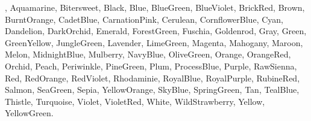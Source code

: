 \documentclass[a4paper,11pt]{article}
\begin{document}
, {\color{Aquamarine} Aquamarine},
{\color{Bittersweet} Bitersweet}, {\color{Black} Black}, {\color{Blue}
  Blue}, {\color{BlueGreen} BlueGreen}, {\color{BlueViolet}
  BlueViolet}, {\color{BrickRed} BrickRed}, {\color{Brown} Brown},
{\color{BurntOrange} BurntOrange}, {\color{CadetBlue} CadetBlue},
{\color{CarnationPink} CarnationPink}, {\color{Cerulean} Cerulean},
{\color{CornflowerBlue} CornflowerBlue}, {\color{Cyan} Cyan},
{\color{Dandelion} Dandelion}, {\color{DarkOrchid} DarkOrchid},
{\color{Emerald} Emerald}, {\color{ForestGreen} ForestGreen},
{\color{Fuchsia} Fuschia}, {\color{Goldenrod} Goldenrod},
{\color{Gray} Gray}, {\color{Green} Green}, {\color{GreenYellow}
  GreenYellow}, {\color{JungleGreen} JungleGreen}, {\color{Lavender}
  Lavender}, {\color{LimeGreen} LimeGreen}, {\color{Magenta} Magenta},
{\color{Mahogany} Mahogany}, {\color{Maroon} Maroon}, {\color{Melon}
  Melon}, {\color{MidnightBlue} MidnightBlue}, {\color{Mulberry}
  Mulberry}, {\color{NavyBlue} NavyBlue}, {\color{OliveGreen}
  OliveGreen}, {\color{Orange} Orange}, {\color{OrangeRed} OrangeRed},
{\color{Orchid} Orchid}, {\color{Peach} Peach}, {\color{Periwinkle}
  Periwinkle}, {\color{PineGreen} PineGreen}, {\color{Plum} Plum},
{\color{ProcessBlue} ProcessBlue}, {\color{Purple} Purple},
{\color{RawSienna} RawSienna}, {\color{Red} Red}, {\color{RedOrange}
  RedOrange}, {\color{RedViolet} RedViolet}, {\color{Rhodamine}
  Rhodaminie}, {\color{RoyalBlue} RoyalBlue}, {\color{RoyalPurple}
  RoyalPurple}, {\color{RubineRed} RubineRed}, {\color{Salmon}
  Salmon}, {\color{SeaGreen} SeaGreen}, {\color{Sepia} Sepia},
{\color{YellowOrange} YellowOrange}, {\color{SkyBlue} SkyBlue},
{\color{SpringGreen} SpringGreen}, {\color{Tan} Tan},
{\color{TealBlue} TealBlue}, {\color{Thistle} Thistle},
{\color{Turquoise} Turquoise}, {\color{Violet} Violet},
{\color{VioletRed} VioletRed}, {\color{White} White},
{\color{WildStrawberry} WildStrawberry}, {\color{Yellow} Yellow},
{\color{YellowGreen} YellowGreen}.






\end{document}
